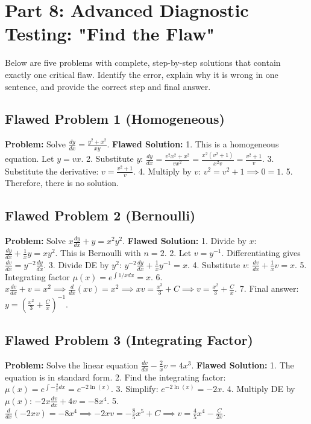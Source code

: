 \documentclass[11pt]{article}
\begin{document}
\newpage
\section{Part 8: Advanced Diagnostic Testing: "Find the Flaw"}

Below are five problems with complete, step-by-step solutions that contain exactly one critical flaw. Identify the error, explain why it is wrong in one sentence, and provide the correct step and final answer.

\subsection*{Flawed Problem 1 (Homogeneous)}
\textbf{Problem:} Solve $\frac{dy}{dx} = \frac{y^2 + x^2}{xy}$.
\textbf{Flawed Solution:}
1. This is a homogeneous equation. Let $y = vx$.
2. Substitute $y$: $\frac{dy}{dx} = \frac{v^2 x^2 + x^2}{vx^2} = \frac{x^2(v^2+1)}{x^2 v} = \frac{v^2+1}{v}$.
3. Substitute the derivative: $v = \frac{v^2+1}{v}$.
4. Multiply by $v$: $v^2 = v^2 + 1 \implies 0 = 1$.
5. Therefore, there is no solution.

\subsection*{Flawed Problem 2 (Bernoulli)}
\textbf{Problem:} Solve $x\frac{dy}{dx} + y = x^2 y^2$.
\textbf{Flawed Solution:}
1. Divide by $x$: $\frac{dy}{dx} + \frac{1}{x}y = x y^2$. This is Bernoulli with $n=2$.
2. Let $v = y^{-1}$. Differentiating gives $\frac{dv}{dx} = y^{-2}\frac{dy}{dx}$.
3. Divide DE by $y^2$: $y^{-2}\frac{dy}{dx} + \frac{1}{x}y^{-1} = x$.
4. Substitute $v$: $\frac{dv}{dx} + \frac{1}{x}v = x$.
5. Integrating factor $\mu(x) = e^{\int 1/x dx} = x$.
6. $x\frac{dv}{dx} + v = x^2 \implies \frac{d}{dx}(xv) = x^2 \implies xv = \frac{x^3}{3} + C \implies v = \frac{x^2}{3} + \frac{C}{x}$.
7. Final answer: $y = \left(\frac{x^2}{3} + \frac{C}{x}\right)^{-1}$.

\subsection*{Flawed Problem 3 (Integrating Factor)}
\textbf{Problem:} Solve the linear equation $\frac{dv}{dx} - \frac{2}{x}v = 4x^3$.
\textbf{Flawed Solution:}
1. The equation is in standard form.
2. Find the integrating factor: $\mu(x) = e^{\int -\frac{2}{x} dx} = e^{-2\ln(x)}$.
3. Simplify: $e^{-2\ln(x)} = -2x$.
4. Multiply DE by $\mu(x)$: $-2x\frac{dv}{dx} + 4v = -8x^4$.
5. $\frac{d}{dx}(-2xv) = -8x^4 \implies -2xv = -\frac{8}{5}x^5 + C \implies v = \frac{4}{5}x^4 - \frac{C}{2x}$.
\end{document}
